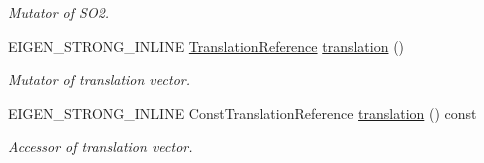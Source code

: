 \begin{DoxyCompactItemize}
\begin{DoxyCompactList}\small\item\em Mutator of S\+O2. \end{DoxyCompactList}\item 
E\+I\+G\+E\+N\+\_\+\+S\+T\+R\+O\+N\+G\+\_\+\+I\+N\+L\+I\+NE \hyperlink{class_sophus_1_1_s_e2_group_afa2e2598cfa5844e7d6a57b5c0b6a38a}{Translation\+Reference} \hyperlink{class_sophus_1_1_s_e2_group_a6e63c40c66f69c7b363570a532b90aab}{translation} ()\hypertarget{class_sophus_1_1_s_e2_group_a6e63c40c66f69c7b363570a532b90aab}{}\label{class_sophus_1_1_s_e2_group_a6e63c40c66f69c7b363570a532b90aab}

\begin{DoxyCompactList}\small\item\em Mutator of translation vector. \end{DoxyCompactList}\item 
E\+I\+G\+E\+N\+\_\+\+S\+T\+R\+O\+N\+G\+\_\+\+I\+N\+L\+I\+NE Const\+Translation\+Reference \hyperlink{class_sophus_1_1_s_e2_group_ae6096a12944c7c6b92b74609a84a6888}{translation} () const \hypertarget{class_sophus_1_1_s_e2_group_ae6096a12944c7c6b92b74609a84a6888}{}\label{class_sophus_1_1_s_e2_group_ae6096a12944c7c6b92b74609a84a6888}

\begin{DoxyCompactList}\small\item\em Accessor of translation vector. \end{DoxyCompactList}\end{DoxyCompactItemize}
